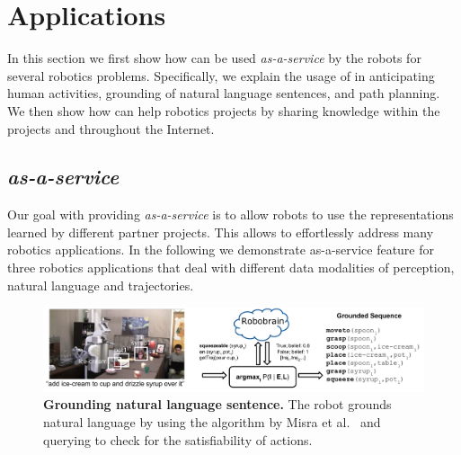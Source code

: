 \section{Applications}
\label{sec:applications}
In this section we first show how \robobrain{} can be used \textit{as-a-service} by the robots for several robotics problems. Specifically, we explain the usage of \robobrain{} in anticipating human activities, grounding of natural language sentences, and path planning. We then show how \robobrain{} can help robotics projects by sharing knowledge within the projects and throughout the Internet.

\subsection{\robobrain{} \textit{as-a-service}}
Our goal with providing \robobrain{} \textit{as-a-service} is to allow robots to use the representations learned by different partner projects. 
This 
allows \robobrain{} to effortlessly address many robotics applications. In the following we demonstrate \robobrain{} as-a-service feature for three robotics applications that deal with different data modalities of perception, natural language and trajectories.



\begin{figure}[t]
\centering
\includegraphics[width=1\linewidth]{./Image/tellmedave_robobrain_pic.pdf}
\caption{\textbf{Grounding natural language sentence.} The robot grounds natural language by using the algorithm by Misra et al.~\cite{misra2014tell} and querying \robobrain{} to check for the satisfiability of actions.}
\label{Fig:languagegrounding}
\end{figure}
%


